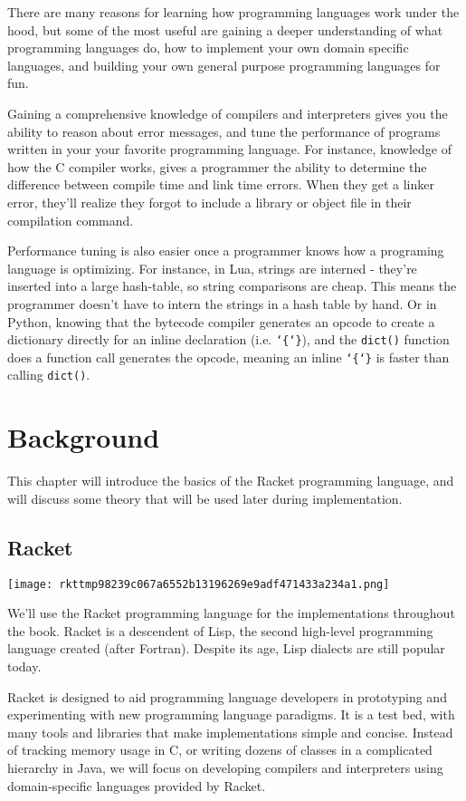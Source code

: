 \documentclass{book}
\newcommand{\sectionNewpage}{}
\newcommand{\Scribtexttt}[1]{{\texttt{#1}}}
\let\SOriginalthesubsection\thesubsection
\let\SOriginalthesubsubsection\thesubsubsection
\newcommand{\Ssection}[2]{\section[#1]{#2}\let\thesubsection\SOriginalthesubsection}
\newcommand{\Ssubsection}[2]{\subsection[#1]{#2}\let\thesubsubsection\SOriginalthesubsubsection}
\renewcommand{\Ssection}[2]{\chapter[#1]{#2}}
\renewcommand{\Ssubsection}[2]{\section[#1]{#2}}
\begin{document}
There are many reasons for learning how programming languages work under
the hood, but some of the most useful are gaining a deeper understanding
of what programming languages do, how to implement your own domain
specific languages, and building your own general purpose programming
languages for fun.

Gaining a comprehensive knowledge of compilers and interpreters gives you
the ability to reason about error messages, and tune the performance of
programs written in your your favorite programming language. For instance,
knowledge of how the C compiler works, gives a programmer the ability to
determine the difference between compile time and link time errors. When
they get a linker error, they{'}ll realize they forgot to include a library
or object file in their compilation command.

Performance tuning is also easier once a programmer knows how a programing
language is optimizing. For instance, in Lua, strings are interned
{-} they{'}re inserted into a large hash{-}table, so string comparisons are
cheap. This means the programmer doesn{'}t have to intern the strings in
a hash table by hand. Or in Python, knowing that the bytecode compiler
generates an opcode to create a dictionary directly for an inline
declaration (i.e. \Scribtexttt{{\char`\{}{\char`\}}}), and the \Scribtexttt{dict()} function does a function
call generates the opcode, meaning an inline \Scribtexttt{{\char`\{}{\char`\}}} is faster than
calling \Scribtexttt{dict()}.

\sectionNewpage

\Ssection{Background}{Background}\label{t:x28part_x22Backgroundx22x29}

This chapter will introduce the basics of the Racket programming language,
and will discuss some theory that will be used later during
implementation.

\Ssubsection{Racket}{Racket}\label{t:x28part_x22Racketx22x29}

\texttt{[image: rkttmp98239c067a6552b13196269e9adf471433a234a1.png]}

We{'}ll use the Racket programming language for the implementations
throughout the book. Racket is a descendent of Lisp, the second high{-}level
programming language created (after Fortran). Despite its age, Lisp
dialects are still popular today.

Racket is designed to aid programming language developers in prototyping
and experimenting with new programming language paradigms. It is a test
bed, with many tools and libraries that make implementations simple and
concise. Instead of tracking memory usage in C, or writing dozens of
classes in a complicated hierarchy in Java, we will focus on developing
compilers and interpreters using domain{-}specific languages provided by
Racket.
\end{document}
